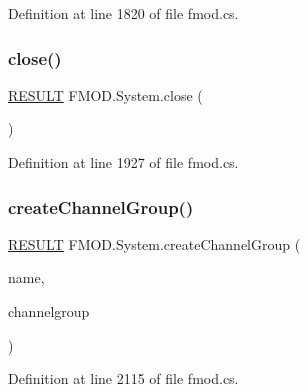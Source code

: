 Definition at line 1820 of file fmod.\+cs.

\mbox{\label{class_f_m_o_d_1_1_system_a5827a74194da6eb5126fabda4cdcfaf5}} 
\subsubsection{\texorpdfstring{close()}{close()}}
{\footnotesize\ttfamily \hyperlink{namespace_f_m_o_d_a305d1176ef3f8c8815861a60407ac33d}{R\+E\+S\+U\+LT} F\+M\+O\+D.\+System.\+close (\begin{DoxyParamCaption}{ }\end{DoxyParamCaption})}



Definition at line 1927 of file fmod.\+cs.

\mbox{\label{class_f_m_o_d_1_1_system_a29fc8a6cab2448b6a7cb01e88a31fd8e}} 
\subsubsection{\texorpdfstring{create\+Channel\+Group()}{createChannelGroup()}}
{\footnotesize\ttfamily \hyperlink{namespace_f_m_o_d_a305d1176ef3f8c8815861a60407ac33d}{R\+E\+S\+U\+LT} F\+M\+O\+D.\+System.\+create\+Channel\+Group (\begin{DoxyParamCaption}\item[{string}]{name,  }\item[{out \hyperlink{class_f_m_o_d_1_1_channel_group}{Channel\+Group}}]{channelgroup }\end{DoxyParamCaption})}



Definition at line 2115 of file fmod.\+cs.

\mbox{\label{class_f_m_o_d_1_1_system_a3b677bf60d4092019a5c8d5d2e2c70c7}} 
